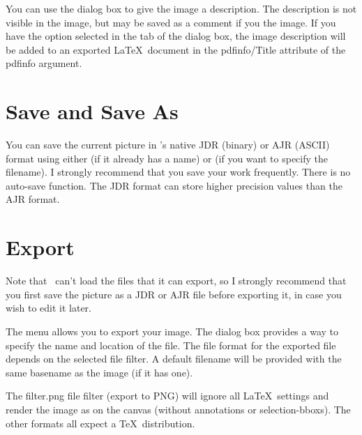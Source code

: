 You can use the  dialog box to give the
image a description. The description is not visible in the image,
but may be saved as a comment if you  the image. If you have the
 option selected in the
 tab of the  dialog box,
the image description will be added to an exported \LaTeX\ document
in the \gls{pdfinfo/Title} attribute of the \gls{pdfinfo} argument.

\section{Save and Save As}\label{sec:saveimage}


You can save the current picture in \FlowframTk's native
\gls{JDR} (binary) or \gls{AJR} (ASCII) format using either
 (if it already has a name)
or  (if you want to specify the
filename).  I strongly recommend that you save your work frequently.
There is no auto-save function. The \gls{JDR} format can store
higher precision values than the \gls{AJR} format.

\section{Export}\label{sec:exportimage}


\begin{warning}
Note that \FlowframTk\ can't load the files that it can export, so I
strongly recommend that you first save the picture as a
\gls{JDR} or \gls{AJR} file before exporting it, in case you
wish to edit it later.
\end{warning}

The  menu allows you to export your image. The
 dialog box provides a way to specify the name
and location of the file.  The file format for the exported file
depends on the selected file filter.  A default filename will be
provided with the same basename as the image (if it has one).

The \gls{filter.png} file filter (export to PNG) will ignore all
\LaTeX\ settings and render the image as 
on the \gls{canvas} (without annotations or \glspl{selection-bbox}).
The other formats all expect a \TeX\ distribution.

